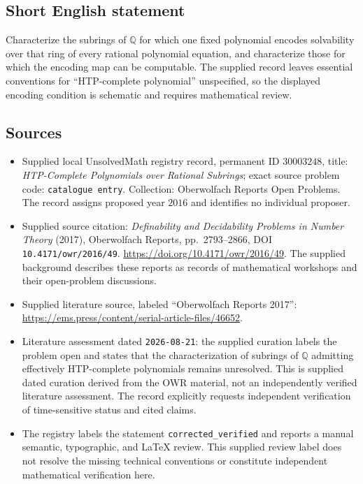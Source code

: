 \documentclass[11pt]{article}
\newcommand{\Q}{\mathbb{Q}}
\begin{document}
\subsection{Short English statement}
Characterize the subrings of \(\Q\) for which one fixed polynomial encodes solvability over that ring of every rational polynomial equation, and characterize those for which the encoding map can be computable. The supplied record leaves essential conventions for ``HTP-complete polynomial'' unspecified, so the displayed encoding condition is schematic and requires mathematical review.
\subsection{Sources}
\begin{itemize}
\item Supplied local UnsolvedMath registry record, permanent ID \(30003248\), title: \emph{HTP-Complete Polynomials over Rational Subrings}; exact source problem code: \texttt{catalogue entry}. Collection: Oberwolfach Reports Open Problems. The record assigns proposed year \(2016\) and identifies no individual proposer.
\item Supplied source citation: \emph{Definability and Decidability Problems in Number Theory} (2017), Oberwolfach Reports, pp.\ 2793--2866, DOI \texttt{10.4171/owr/2016/49}. \url{https://doi.org/10.4171/owr/2016/49}. The supplied background describes these reports as records of mathematical workshops and their open-problem discussions.
\item Supplied literature source, labeled ``Oberwolfach Reports 2017'': \url{https://ems.press/content/serial-article-files/46652}.
\item Literature assessment dated \texttt{2026-08-21}: the supplied curation labels the problem open and states that the characterization of subrings of \(\Q\) admitting effectively HTP-complete polynomials remains unresolved. This is supplied dated curation derived from the OWR material, not an independently verified literature assessment. The record explicitly requests independent verification of time-sensitive status and cited claims.
\item The registry labels the statement \texttt{corrected\_verified} and reports a manual semantic, typographic, and LaTeX review. This supplied review label does not resolve the missing technical conventions or constitute independent mathematical verification here.
\end{itemize}
\end{document}
